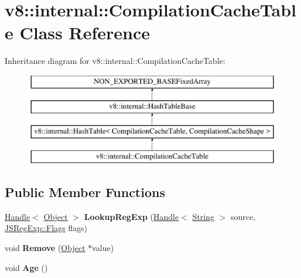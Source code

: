 \hypertarget{classv8_1_1internal_1_1CompilationCacheTable}{}\section{v8\+:\+:internal\+:\+:Compilation\+Cache\+Table Class Reference}
\label{classv8_1_1internal_1_1CompilationCacheTable}
Inheritance diagram for v8\+:\+:internal\+:\+:Compilation\+Cache\+Table\+:\begin{figure}[H]
\begin{center}
\leavevmode
\includegraphics[height=4.000000cm]{classv8_1_1internal_1_1CompilationCacheTable}
\end{center}
\end{figure}
\subsection*{Public Member Functions}
\begin{DoxyCompactItemize}
\item 
\mbox{\label{classv8_1_1internal_1_1CompilationCacheTable_a3cddd5ab9d8f79df18a17a244da11904}} 
\mbox{\hyperlink{classv8_1_1internal_1_1Handle}{Handle}}$<$ \mbox{\hyperlink{classv8_1_1internal_1_1Object}{Object}} $>$ {\bfseries Lookup\+Reg\+Exp} (\mbox{\hyperlink{classv8_1_1internal_1_1Handle}{Handle}}$<$ \mbox{\hyperlink{classv8_1_1internal_1_1String}{String}} $>$ source, \mbox{\hyperlink{classv8_1_1base_1_1Flags}{J\+S\+Reg\+Exp\+::\+Flags}} flags)
\item 
\mbox{\label{classv8_1_1internal_1_1CompilationCacheTable_aaa1a061ec7d89c45fe7901eedb7d8e4c}} 
void {\bfseries Remove} (\mbox{\hyperlink{classv8_1_1internal_1_1Object}{Object}} $\ast$value)
\item 
\mbox{\label{classv8_1_1internal_1_1CompilationCacheTable_aa0b4746b24afe324bbe1450553a75506}} 
void {\bfseries Age} ()
\end{DoxyCompactItemize}
